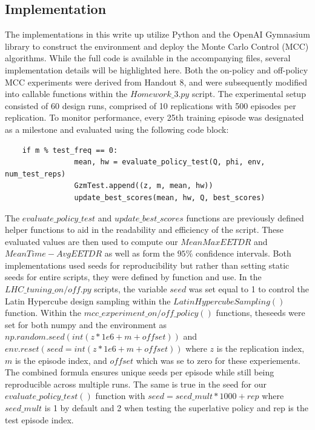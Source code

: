 \documentclass{article}
\begin{document}
\subsection{Implementation}
The implementations in this write up utilize Python and the OpenAI Gymnasium library to construct the environment and deploy the Monte Carlo Control (MCC) algorithms. While the full code is available in the accompanying files, several implementation details will be highlighted here. Both the on-policy and off-policy MCC experiments were derived from Handout 8, and were subsequently modified into callable functions within the $Homework\_3.py$ script. The experimental setup consisted of 60 design runs, comprised of 10 replications with 500 episodes per replication. To monitor performance, every 25th training episode was designated as a milestone and evaluated using the following code block:
\begin{verbatim}
    if m % test_freq == 0:
                mean, hw = evaluate_policy_test(Q, phi, env, num_test_reps)
                GzmTest.append((z, m, mean, hw))
                update_best_scores(mean, hw, Q, best_scores)
\end{verbatim}
The $evaluate\_policy\_test$ and $update\_best\_scores$ functions are previously defined helper functions to aid in the readability and efficiency of the script. These evaluated values are then used to compute our $Mean MaxEETDR$ and $Mean Time-AvgEETDR$ as well as form the $95\%$ confidence intervals.
Both implementations used seeds for reproducibility but rather than setting static seeds for entire scripts, they were defined by function and use. In the $LHC\_tuning\_on/off.py$ scripts, the variable $seed$ was set equal to 1 to control the Latin Hypercube design sampling within the $LatinHypercubeSampling()$ function. Within the $mcc\_experiment\_on/off\_policy()$ functions, theseeds were set for both numpy and the environment as $np.random.seed(int(z*1e6+m+offset))$ and $env.reset(seed=int(z*1e6+m+offset))$ where $z$ is the replication index, $m$ is the episode index, and $offset$ which was se to zero for these experiements. The combined formula ensures unique seeds per episode while still being reproducible across multiple runs. The same is true in the seed for our $evaluate\_policy\_test()$ function with $seed = seed\_mult*1000+rep$ where $seed\_mult$ is 1 by default and 2 when testing the superlative policy and rep is the test episode index.
\end{document}

